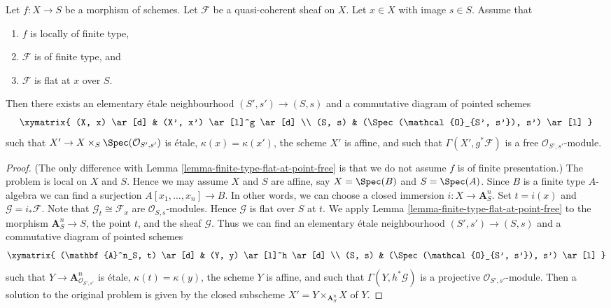 \begin{lemma}
\label{lemma-finite-type-flat-at-point-free-variant}
Let $f : X \to S$ be a morphism of schemes.
Let $\mathcal{F}$ be a quasi-coherent sheaf on $X$.
Let $x \in X$ with image $s \in S$.
Assume that
\begin{enumerate}
\item $f$ is locally of finite type,
\item $\mathcal{F}$ is of finite type, and
\item $\mathcal{F}$ is flat at $x$ over $S$.
\end{enumerate}
Then there exists an elementary \'etale neighbourhood $(S', s') \to (S, s)$
and a commutative diagram of pointed schemes
$$
\xymatrix{
(X, x) \ar[d] & (X', x') \ar[l]^g \ar[d] \\
(S, s) & (\Spec(\mathcal{O}_{S', s'}), s') \ar[l]
}
$$
such that $X' \to X \times_S \Spec(\mathcal{O}_{S', s'})$
is \'etale, $\kappa(x) = \kappa(x')$, the scheme $X'$ is
affine, and such that $\Gamma(X', g^*\mathcal{F})$ is a free
$\mathcal{O}_{S', s'}$-module.
\end{lemma}

\begin{proof}
(The only difference with
Lemma \ref{lemma-finite-type-flat-at-point-free}
is that we do not assume $f$ is of finite presentation.)
The problem is local on $X$ and $S$. Hence we may assume $X$ and
$S$ are affine, say $X = \Spec(B)$ and $S = \Spec(A)$.
Since $B$ is a finite type $A$-algebra we can find a surjection
$A[x_1, \ldots, x_n] \to B$. In other words, we can choose a closed
immersion $i : X \to \mathbf{A}^n_S$. Set $t = i(x)$ and
$\mathcal{G} = i_*\mathcal{F}$. Note that $\mathcal{G}_t \cong \mathcal{F}_x$
are $\mathcal{O}_{S, s}$-modules. Hence $\mathcal{G}$ is flat over $S$ at $t$.
We apply
Lemma \ref{lemma-finite-type-flat-at-point-free}
to the morphism $\mathbf{A}^n_S \to S$, the point $t$, and the
sheaf $\mathcal{G}$. Thus we can find an
elementary \'etale neighbourhood $(S', s') \to (S, s)$
and a commutative diagram of pointed schemes
$$
\xymatrix{
(\mathbf{A}^n_S, t) \ar[d] & (Y, y) \ar[l]^h \ar[d] \\
(S, s) & (\Spec(\mathcal{O}_{S', s'}), s') \ar[l]
}
$$
such that $Y \to \mathbf{A}^n_{\mathcal{O}_{S', s'}}$
is \'etale, $\kappa(t) = \kappa(y)$, the scheme $Y$ is
affine, and such that $\Gamma(Y, h^*\mathcal{G})$ is a projective
$\mathcal{O}_{S', s'}$-module. Then a solution to the original
problem is given by the closed subscheme
$X' = Y \times_{\mathbf{A}^n_S} X$ of $Y$.
\end{proof}
